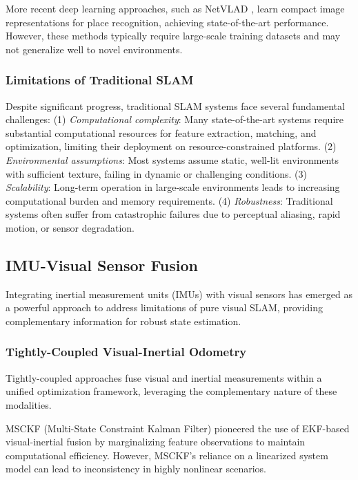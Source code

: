More recent deep learning approaches, such as NetVLAD \cite{Arandjelovic2016}, learn compact image representations for place recognition, achieving state-of-the-art performance.
However, these methods typically require large-scale training datasets and may not generalize well to novel environments.

\subsubsection{Limitations of Traditional SLAM}

Despite significant progress, traditional SLAM systems face several fundamental challenges:
(1) \textit{Computational complexity}: Many state-of-the-art systems require substantial computational resources for feature extraction, matching, and optimization, limiting their deployment on resource-constrained platforms.
(2) \textit{Environmental assumptions}: Most systems assume static, well-lit environments with sufficient texture, failing in dynamic or challenging conditions.
(3) \textit{Scalability}: Long-term operation in large-scale environments leads to increasing computational burden and memory requirements.
(4) \textit{Robustness}: Traditional systems often suffer from catastrophic failures due to perceptual aliasing, rapid motion, or sensor degradation.


\subsection{IMU-Visual Sensor Fusion}

Integrating inertial measurement units (IMUs) with visual sensors has emerged as a powerful approach to address limitations of pure visual SLAM, providing complementary information for robust state estimation.

\subsubsection{Tightly-Coupled Visual-Inertial Odometry}

Tightly-coupled approaches fuse visual and inertial measurements within a unified optimization framework, leveraging the complementary nature of these modalities.

MSCKF (Multi-State Constraint Kalman Filter) \cite{Mourikis2007} pioneered the use of EKF-based visual-inertial fusion by marginalizing feature observations to maintain computational efficiency.
However, MSCKF's reliance on a linearized system model can lead to inconsistency in highly nonlinear scenarios.

